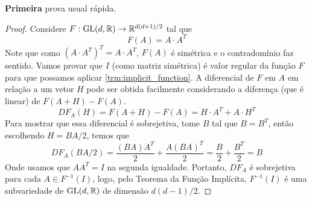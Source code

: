 \begin{problem}
    \label{prob:l2:4} 
\end{problem}
\textbf{Primeira} prova usual rápida.
\begin{proof}
    Considere $F: \text{GL}(d,\mathbb{R}) \rightarrow \mathbb{R}^{d(d+1)/2}$ tal que
    $$F(A) = A\cdot A^{T}$$
    Note que como $(A \cdot A^T)^T = A\cdot A^T$, $F(A)$ é simétrica e o contradomínio faz sentido.
    Vamos provar que $I$ (como matriz simétrica) é valor regular da função $F$ para que possamos aplicar \ref{trm:implicit_function}.
    A diferencial de $F$ em $A$ em relação a um vetor $H$ pode ser obtida facilmente considerando a diferença (que é linear) de $F(A + H) - F(A)$.
    $$DF_A(H) = F(A + H) - F(A) = H\cdot A^T + A \cdot H^T$$
    Para mostrar que essa diferencial é sobrejetiva, tome $B$ tal que $B = B^T$, então escolhendo $H = BA/2$, temos que 
    $$DF_A(BA/2) = \frac{(BA)A^T}{2} + \frac{A(BA)^T}{2} = \frac{B}{2} + \frac{B^T}{2} = B$$
    Onde usamos que $AA^T = I$ na segunda igualdade. Portanto, $DF_A$ é sobrejetiva para cada $A \in F^{-1}(I)$, logo, 
    pelo Teorema da Função Implícita, $F^{-1}(I)$ é uma subvariedade de $\text{GL}(d,\mathbb{R})$ de dimensão $d(d-1)/2$.
\end{proof}

